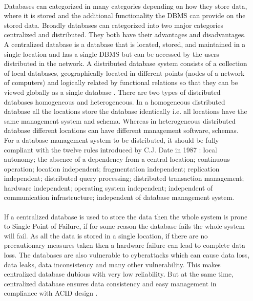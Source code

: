 \documentclass{article}
\begin{document}
        \paragraph{}
        Databases can categorized in many categories depending on how they store data, where it is stored and the additional functionality the DBMS can provide on the stored data. Broadly databases can categorized into two major categories centralized and distributed. They both have their advantages and disadvantages.
        A centralized database is a database that is located, stored, and maintained in a single location and has a single DBMS but can be accessed by the users distributed in the network.
        A distributed database system consists of a collection of local databases,  geographically located in different points (nodes of a network of computers) and  logically related by functional relations so that they can be viewed globally as a single database \cite{distributeddatabase}.
        There are two types of distributed databases homogeneous and heterogeneous. In a homogeneous distributed database all the locations store the database identically i.e. all locations have the same management system and schema. Whereas in heterogeneous distributed database different locations can have different management software, schemas.
        For a database management system to be distributed, it should be fully compliant with the twelve rules introduced by C.J. Date in 1987 \cite{distributeddbms}: local autonomy; the absence of a dependency from a central location; continuous operation; location independent; fragmentation independent; replication  independent; distributed query processing; distributed transaction management; hardware independent; operating system independent; independent of communication  infrastructure; independent of database management system.
        
        \paragraph{}
        If a centralized database is used to store the data then the whole system is prone to Single Point of Failure, if for some reason the database fails the whole system will fail. As all the data is stored in a single location, if there are no  precautionary measures taken then a hardware failure can lead to complete data loss. The databases are also vulnerable to cyberattacks which can cause data loss, data leaks, data inconsistency and many other vulnerability. This makes centralized database dubious with very low reliability. But at the same time, centralized database ensures data consistency and easy management in compliance with ACID design \cite{centralizeddistributeddatabases}.
        
\end{document}
